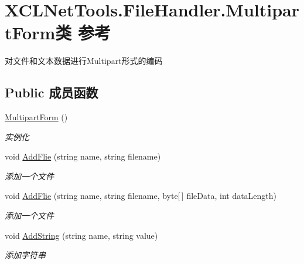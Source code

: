 \hypertarget{class_x_c_l_net_tools_1_1_file_handler_1_1_multipart_form}{\section{X\-C\-L\-Net\-Tools.\-File\-Handler.\-Multipart\-Form类 参考}
\label{class_x_c_l_net_tools_1_1_file_handler_1_1_multipart_form}
}


对文件和文本数据进行\-Multipart形式的编码  


\subsection*{Public 成员函数}
\begin{DoxyCompactItemize}
\item 
\hyperlink{class_x_c_l_net_tools_1_1_file_handler_1_1_multipart_form_ab1d1debcf1e0f5dc05e9758f72b4500d}{Multipart\-Form} ()
\begin{DoxyCompactList}\small\item\em 实例化 \end{DoxyCompactList}\item 
void \hyperlink{class_x_c_l_net_tools_1_1_file_handler_1_1_multipart_form_af2601517bb4cafc5c9648945ed3e5572}{Add\-Flie} (string name, string filename)
\begin{DoxyCompactList}\small\item\em 添加一个文件 \end{DoxyCompactList}\item 
void \hyperlink{class_x_c_l_net_tools_1_1_file_handler_1_1_multipart_form_a5b531d40e9baf9f5ca51260bd4403b00}{Add\-Flie} (string name, string filename, byte\mbox{[}$\,$\mbox{]} file\-Data, int data\-Length)
\begin{DoxyCompactList}\small\item\em 添加一个文件 \end{DoxyCompactList}\item 
void \hyperlink{class_x_c_l_net_tools_1_1_file_handler_1_1_multipart_form_ab791aa6797ff7253f448fbad17ec0841}{Add\-String} (string name, string value)
\begin{DoxyCompactList}\small\item\em 添加字符串 \end{DoxyCompactList}\end{DoxyCompactItemize}
